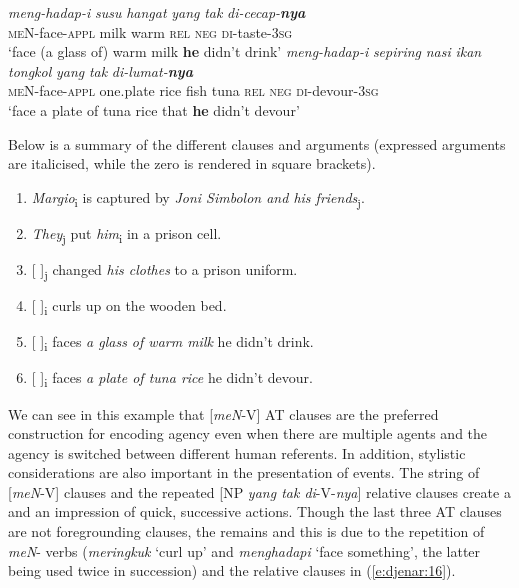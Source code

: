 \documentclass[output=paper
,modfonts
,nonflat]{langsci/langscibook}
\begin{document}
\begin{exe}
	\ex\label{e:djenar:16}
	\begin{xlist}
		\ex \gll \textit{meng-hadap-i} \textit{susu} \textit{hangat} \textit{yang} \textit{tak} \textit{di-cecap-}\textbf{\textit{nya}}\\
		\textsc{meN}-face-\textsc{appl}  milk  warm  \textsc{rel}  \textsc{neg}  \textsc{di}-taste-\textsc{3sg}\\
		\glt ‘face (a glass of) warm milk \textbf{he} didn’t drink’\label{e:djenar:42a}
		\ex \gll \textit{meng-hadap-i} \textit{sepiring} \textit{nasi} \textit{ikan} \textit{tongkol} \textit{yang} \textit{tak} \textit{di-lumat-}\textbf{\textit{nya}}\\
		\textsc{meN}-face-\textsc{appl} one.plate rice fish tuna \textsc{rel} \textsc{neg} \textsc{di}-devour-\textsc{3sg}\\
		\glt ‘face a plate of tuna rice that \textbf{he} didn’t devour’\label{e:djenar:42b}
	\end{xlist}
\end{exe}

\noindent
Below is a summary of the different clauses and arguments (expressed arguments are italicised, while the zero is rendered in square brackets). 

\begin{enumerate}
	\item \textit{Margio}\textsubscript{i} is captured by \textit{Joni Simbolon and his friends}\textsubscript{j}.
	\item \textit{They}\textsubscript{j} put \textit{him}\textsubscript{i} in a prison cell.
	\item {[ ]}\textsubscript{j} changed \textit{his clothes} to a prison uniform.
	\item {[ ]}\textsubscript{i} curls up on the wooden bed.
	\item {[ ]}\textsubscript{i} faces \textit{a glass of warm milk} he didn’t drink.
	\item {[ ]}\textsubscript{i} faces \textit{a plate of tuna rice} he didn’t devour. 
\end{enumerate}

\noindent
We can see in this example that [\textit{meN}-V] AT clauses are the preferred construction for encoding agency even when there are multiple agents and the agency is switched between different human referents. In addition, stylistic considerations are also important in the presentation of events. The string of [\textit{meN}-V] clauses and the repeated [NP \textit{yang tak di}-V-\textit{nya}] relative clauses create a  and an impression of quick, successive actions. Though the last three AT clauses are not foregrounding clauses, the  remains and this is due to the repetition of \textit{meN}- verbs (\textit{meringkuk} ‘curl up’ and \textit{menghadapi} ‘face something’, the latter being used twice in succession) and the relative clauses in (\ref{e:djenar:16}).  
\end{document}
